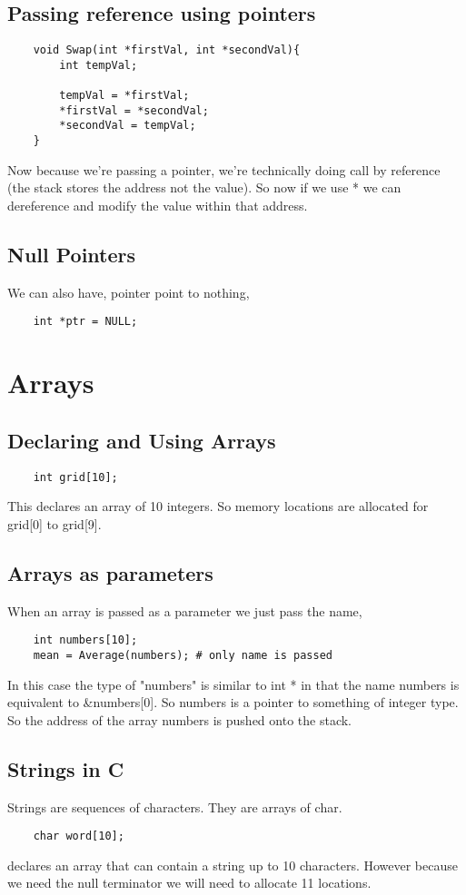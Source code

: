 \subsection{Passing reference using pointers}
\begin{verbatim}
    void Swap(int *firstVal, int *secondVal){
        int tempVal;

        tempVal = *firstVal;
        *firstVal = *secondVal;
        *secondVal = tempVal;
    }
\end{verbatim}
Now because we're passing a pointer, we're technically doing call by reference (the stack stores the address not the value). So now if we use * we can dereference and modify the value within that address.

\subsection{Null Pointers}
We can also have, pointer point to nothing,
\begin{verbatim}
    int *ptr = NULL;
\end{verbatim}

\section{Arrays}
\subsection{Declaring and Using Arrays}
\begin{verbatim}
    int grid[10];
\end{verbatim}
This declares an array of 10 integers. So memory locations are allocated for grid[0] to grid[9].


\subsection{Arrays as parameters}
When an array is passed as a parameter we just pass the name, 
\begin{verbatim}
    int numbers[10];
    mean = Average(numbers); # only name is passed
\end{verbatim}

In this case the type of "numbers" is similar to int * in that the name numbers is equivalent to \&numbers[0]. So numbers is a pointer to something of integer type. So the address of the array numbers is pushed onto the stack. 


\subsection{Strings in C}
Strings are sequences of characters. They are arrays of char.
\begin{verbatim}
    char word[10];
\end{verbatim}
declares an array that can contain a string up to 10 characters. However because we need the null terminator we will need to allocate 11 locations.

